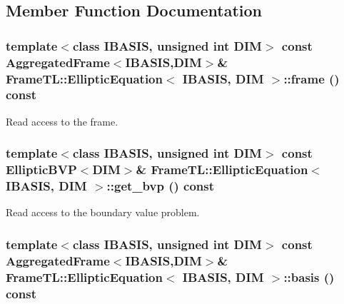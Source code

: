 \subsection{Member Function Documentation}
\hypertarget{classFrameTL_1_1EllipticEquation_49f035460f9c0a08ed1a292bf6d3e7f9}{
\subsubsection[frame]{\setlength{\rightskip}{0pt plus 5cm}template$<$class IBASIS, unsigned int DIM$>$ const {\bf AggregatedFrame}$<$IBASIS,DIM$>$\& {\bf FrameTL::EllipticEquation}$<$ IBASIS, DIM $>$::frame () const}}
\label{classFrameTL_1_1EllipticEquation_49f035460f9c0a08ed1a292bf6d3e7f9}


Read access to the frame. \hypertarget{classFrameTL_1_1EllipticEquation_7574a07220674516f1be1fd38b3fb4cc}{
\subsubsection[get\_\-bvp]{\setlength{\rightskip}{0pt plus 5cm}template$<$class IBASIS, unsigned int DIM$>$ const EllipticBVP$<$DIM$>$\& {\bf FrameTL::EllipticEquation}$<$ IBASIS, DIM $>$::get\_\-bvp () const}}
\label{classFrameTL_1_1EllipticEquation_7574a07220674516f1be1fd38b3fb4cc}


Read access to the boundary value problem. \hypertarget{classFrameTL_1_1EllipticEquation_f3c3552134fe3d41c4d4d00b13130381}{
\subsubsection[basis]{\setlength{\rightskip}{0pt plus 5cm}template$<$class IBASIS, unsigned int DIM$>$ const {\bf AggregatedFrame}$<$IBASIS,DIM$>$\& {\bf FrameTL::EllipticEquation}$<$ IBASIS, DIM $>$::basis () const}}
\label{classFrameTL_1_1EllipticEquation_f3c3552134fe3d41c4d4d00b13130381}


